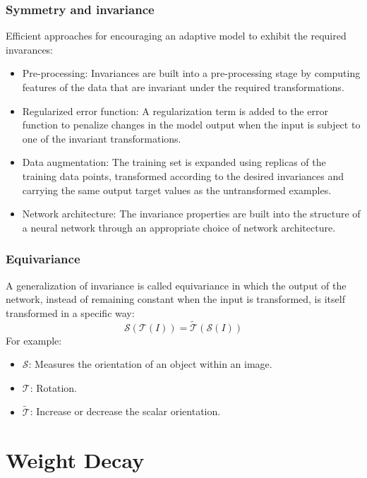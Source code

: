 \documentclass{beamer}
\begin{document}
\begin{frame}
    \frametitle{Symmetry and invariance}
    Efficient approaches for encouraging an adaptive model to exhibit the required invarances:
    \begin{itemize}
        \item Pre-processing: Invariances are built into a pre-processing stage by computing features of the data that are invariant under the required transformations.
        \item Regularized error function: A regularization term is added to the error function to penalize changes in the model output when the input is subject to one of the invariant transformations.
        \item Data augmentation: The training set is expanded using replicas of the training data points, transformed according to the desired invariances and carrying the same output target values as the untransformed examples.
        \item Network architecture: The invariance properties are built into the structure of a neural network through an appropriate choice of network architecture.
    \end{itemize}
\end{frame}

\begin{frame}
    \frametitle{Equivariance}
    A generalization of invariance is called equivariance in which the output of the network, instead of remaining constant when the input is transformed, is itself transformed in a specific way:
    \begin{equation*}
        \mathcal{S}(\mathcal{T}(I))=\tilde{\mathcal{T}}(\mathcal{S}(I))
    \end{equation*}
    For example:
    \begin{itemize}
        \item $\mathcal{S}$: Measures the orientation of an object within an image.
        \item $\mathcal{T}$: Rotation.
        \item $\tilde{\mathcal{T}}$: Increase or decrease the scalar orientation.
    \end{itemize}
\end{frame}

\section{Weight Decay}
\end{document}
